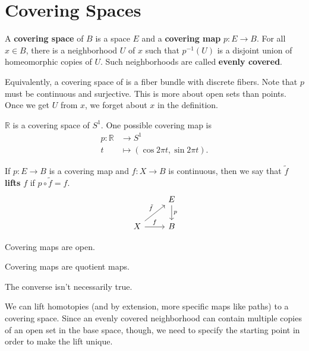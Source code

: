 \documentclass[twoside,10pt]{report}
\begin{document}

\section{Covering Spaces}

\begin{defn}[]
	A \textbf{covering space} of $B$ is a space $E$ and a \textbf{covering map} $p:E\to B$. For all $x \in B$, there is a neighborhood $U$ of $x$ such that $p^{-1}(U)$ is a disjoint union of homeomorphic copies of $U$. Such neighborhoods are called \textbf{evenly covered}.
\end{defn}
Equivalently, a covering space of is a fiber bundle with discrete fibers. Note that $p$ must be continuous and surjective. This is more about open sets than points. Once we get $U$ from $x$, we forget about $x$ in the definition.

\begin{ex}[]
	$\mathbb{R}$ is a covering space of $S^{1}$. One possible covering map is
		\begin{align*}
			p:\mathbb{R}&\to S^{1}\\
			t&\mapsto (\cos 2\pi t,\sin 2\pi t).
		\end{align*}
\end{ex}

\begin{defn}[]
If $p:E\to B$ is a covering map and $f:X\to B$ is continuous, then we say that $\tilde{f}$ \textbf{lifts} $f$ if $p \circ \tilde{f}=f$.
\[
\begin{tikzcd}
	&E\dar{p}\\
	X\rar{f}\arrow[ur,"\tilde{f}"]&B
\end{tikzcd}
\] 
\end{defn}

\begin{prop}
Covering maps are open.
\end{prop}

\begin{cor}
Covering maps are quotient maps.
\end{cor}
{\color{red}The converse isn't necessarily true.}

We can lift homotopies (and by extension, more specific maps like paths) to a covering space. Since an evenly covered neighborhood can contain multiple copies of an open set in the base space, though, we need to specify the starting point in order to make the lift unique.
\end{document}
